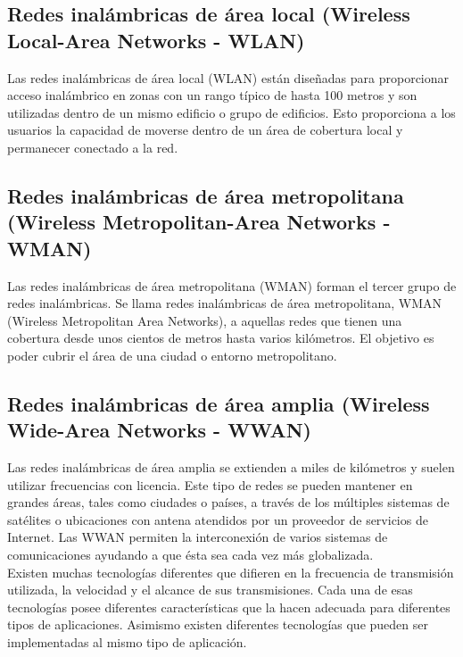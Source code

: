 	\subsection{Redes inalámbricas de área local (Wireless Local-Area Networks - WLAN)}
	Las redes inalámbricas de área local (WLAN) están diseñadas para proporcionar acceso inalámbrico en zonas con un rango típico de hasta 100 metros y son utilizadas dentro de un mismo edificio o grupo de edificios. Esto proporciona a los usuarios la capacidad de moverse dentro de un área de cobertura local y permanecer conectado a la red. \cite{salazarRedes}
	
	\subsection{Redes inalámbricas de área metropolitana (Wireless Metropolitan-Area Networks - WMAN)}
	Las redes inalámbricas de área metropolitana (WMAN) forman el tercer grupo de redes inalámbricas. Se llama redes inalámbricas de área metropolitana, WMAN (Wireless Metropolitan Area Networks), a aquellas redes que tienen una cobertura desde unos cientos de metros hasta varios kilómetros. El objetivo es poder cubrir el área de una ciudad o entorno metropolitano. \cite{salazarRedes} \cite{yunqyeraWiFi}
	
	\subsection{Redes inalámbricas de área amplia (Wireless Wide-Area Networks - WWAN)}
	Las redes inalámbricas de área amplia se extienden a miles de kilómetros y suelen utilizar frecuencias con licencia. Este tipo de redes se pueden mantener en grandes áreas, tales como ciudades o países, a través de los múltiples sistemas de satélites o ubicaciones con antena atendidos por un proveedor de servicios de Internet. Las WWAN permiten la interconexión de varios sistemas de comunicaciones ayudando a que ésta sea cada vez más globalizada. \cite{salazarRedes} \\
	
	Existen muchas tecnologías diferentes que difieren en la frecuencia de transmisión utilizada, la velocidad y el alcance de sus transmisiones. Cada una de esas tecnologías posee diferentes características que la hacen adecuada para diferentes tipos de aplicaciones. Asimismo existen diferentes tecnologías que pueden ser implementadas al mismo tipo de aplicación. \\
	
